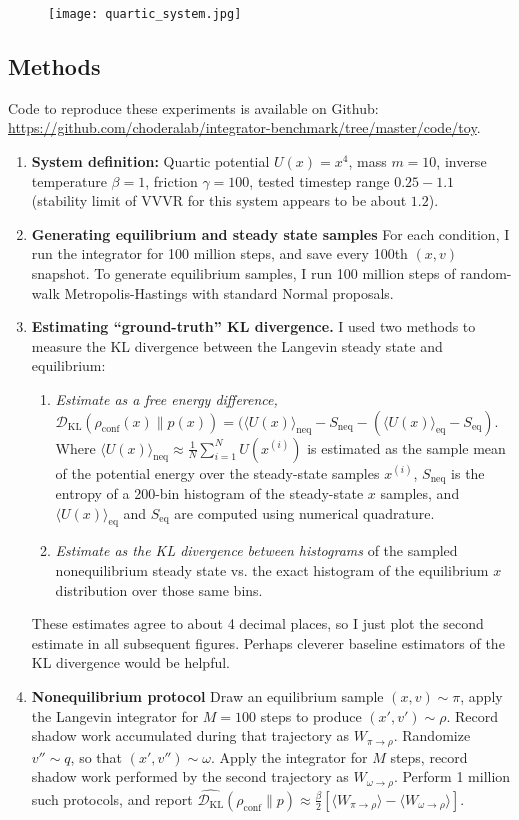 \documentclass[11pt]{article}
\newcommand{\kldiv}{\mathcal{D}_\text{KL}}
\newcommand{\conf}{\rho_\text{conf}}
\begin{document}
\begin{figure}[h]
	\centering
	\texttt{[image: quartic\_system.jpg]}
\end{figure}

\subsection{Methods}
Code to reproduce these experiments is available on Github: \url{https://github.com/choderalab/integrator-benchmark/tree/master/code/toy}.

\begin{enumerate}
\item \textbf{System definition:} Quartic potential $U(x) = x^4$, mass $m=10$, inverse temperature $\beta = 1$, friction $\gamma = 100$, tested timestep range $0.25-1.1$ (stability limit of VVVR for this system appears to be about $1.2$).
\item \textbf{Generating equilibrium and steady state samples} For each condition, I run the integrator for 100 million steps, and save every 100th $(x,v)$ snapshot. To generate equilibrium samples, I run 100 million steps of random-walk Metropolis-Hastings with standard Normal proposals.
\item \textbf{Estimating ``ground-truth'' KL divergence.} I used two methods to measure the KL divergence between the Langevin steady state and equilibrium:
\begin{enumerate}
\item \textit{Estimate as a free energy difference,} $\kldiv( \conf(x) \| p(x) ) = (\langle U(x) \rangle_\text{neq} - S_\text{neq} -  (\langle U(x) \rangle_\text{eq} - S_\text{eq})$. Where $\langle U(x) \rangle_\text{neq} \approx \frac{1}{N} \sum_{i=1}^N U(x^{(i)})$ is estimated as the sample mean of the potential energy over the steady-state samples $x^{(i)}$, $S_\text{neq}$ is the entropy of a 200-bin histogram of the steady-state $x$ samples, and $\langle U(x) \rangle_\text{eq}$ and $S_\text{eq}$ are computed using numerical quadrature.
\item \textit{Estimate as the KL divergence between histograms} of the sampled nonequilibrium steady state vs. the exact histogram of the equilibrium $x$ distribution over those same bins.
\end{enumerate}
These estimates agree to about 4 decimal places, so I just plot the second estimate in all subsequent figures.
Perhaps cleverer baseline estimators of the KL divergence would be helpful.
\item \textbf{Nonequilibrium protocol} Draw an equilibrium sample $(x,v) \sim \pi$, apply the Langevin integrator for $M=100$ steps to produce $(x', v') \sim \rho$. Record shadow work accumulated during that trajectory as $W_{\pi \to \rho}$. Randomize $v'' \sim q$, so that $(x', v'') \sim \omega$. Apply the integrator for $M$ steps, record shadow work performed by the second trajectory as $W_{\omega \to \rho}$. Perform 1 million such protocols, and report $\hat{\kldiv}(\conf \| p) \approx \frac{\beta}{2} [ \langle W_{\pi \to \rho} \rangle - \langle W_{\omega \to \rho} \rangle ]$.
\end{enumerate}
\end{document}
